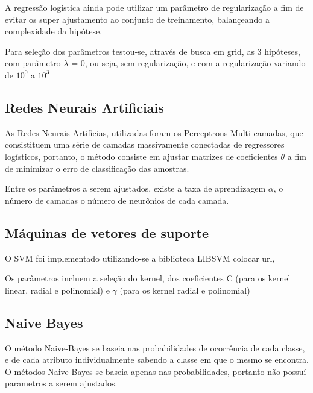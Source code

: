 A regressão logística ainda pode utilizar um parâmetro de regularização a fim de evitar os super ajustamento ao conjunto de treinamento, balançeando a complexidade da hipótese.

Para seleção dos parâmetros testou-se, através de busca em grid, as 3 hipóteses, com parâmetro \(\lambda\) = 0, ou seja, sem regularização, e com a regularização variando de \(10^0\) a \(10^3\) 

\subsection{Redes Neurais Artificiais}

As Redes Neurais Artificias, utilizadas foram os Perceptrons Multi-camadas, que consistituem uma série de camadas massivamente conectadas de regressores logísticos, portanto, o método consiste em ajustar matrizes de coeficientes \(\theta\) a fim de minimizar o erro de classificação das amostras.

Entre os parâmetros a serem ajustados, existe a taxa de aprendizagem \(\alpha\), o número de camadas o número de neurônios de cada camada.

\subsection{Máquinas de vetores de suporte}

O SVM foi implementado utilizando-se a biblioteca LIBSVM colocar url, 

Os parâmetros incluem a seleção do kernel, dos coeficientes C (para os kernel linear, radial e polinomial) e \(\gamma\) (para os kernel radial e polinomial)

\subsection{Naive Bayes}

O método Naive-Bayes se baseia nas probabilidades de ocorrência de cada classe, e de cada atributo individualmente sabendo a classe em que o mesmo se encontra. O métodos Naive-Bayes se baseia apenas nas probabilidades, portanto não possuí parametros a serem ajustados.

